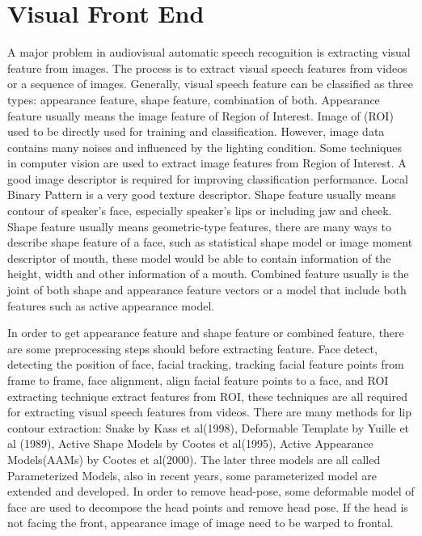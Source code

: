 \section{Visual Front End}
A major problem in audiovisual automatic speech recognition is extracting visual feature from images. The process is to extract visual speech features from videos or a sequence of images. Generally, visual speech feature can be classified as three types: appearance feature, shape feature, combination of both\cite{potamianos2003recent}. Appearance feature usually means the image feature of Region of Interest. Image of (ROI) used to be directly used for training and classification. However, image data contains many noises and influenced by the lighting condition. Some techniques in computer vision are used to extract image features from Region of Interest. A good image descriptor is required for improving classification performance. Local Binary Pattern is a very good texture descriptor. Shape feature usually means contour of speaker's face, especially speaker's lips or including jaw and cheek. Shape feature usually means geometric-type features, there are many ways to describe shape feature of a face, such as statistical shape model or image moment descriptor of mouth, these model would be able to contain information of the height, width and other information of a mouth. Combined feature usually is the joint of both shape and appearance feature vectors or a model that include both features such as active appearance model.

In order to get appearance feature and shape feature or combined feature, there are some preprocessing steps should before extracting feature. Face detect, detecting the position of face, facial tracking, tracking facial feature points from frame to frame, face alignment, align facial feature points to a face, and ROI extracting technique extract features from ROI, these techniques are all required for extracting visual speech features from videos. There are many methods for lip contour extraction: Snake by Kass et al(1998), Deformable Template by Yuille et al (1989), Active Shape Models by Cootes et al(1995), Active Appearance Models(AAMs) by Cootes et al(2000). The later three models are all called Parameterized Models, also in recent years, some parameterized model are extended and developed. In order to remove head-pose, some deformable model of face are used to decompose the head points and remove head pose. If the head is not facing the front, appearance image of image need to be warped to frontal.
